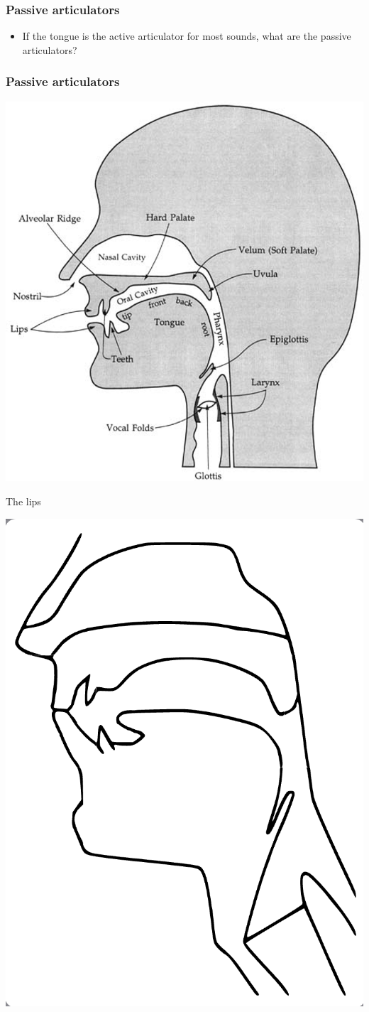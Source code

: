 \documentclass[professionalfonts]{beamer}
\begin{document}
\begin{frame}
    \frametitle{Passive articulators}

    \begin{itemize}
        \item If the tongue is the active articulator for most sounds, what are the passive articulators?
    \end{itemize}
\end{frame}

\begin{frame}
    \frametitle{Passive articulators}

    \begin{center}
        \includegraphics[width = .5\textwidth]{figs/VocalTractLabeled.png}
    \end{center}
\end{frame}

\begin{frame}{The lips}
    \begin{center}
        \includegraphics[width = .5\textwidth]{figs/Labials.png}
    \end{center}
\end{frame}
\end{document}
